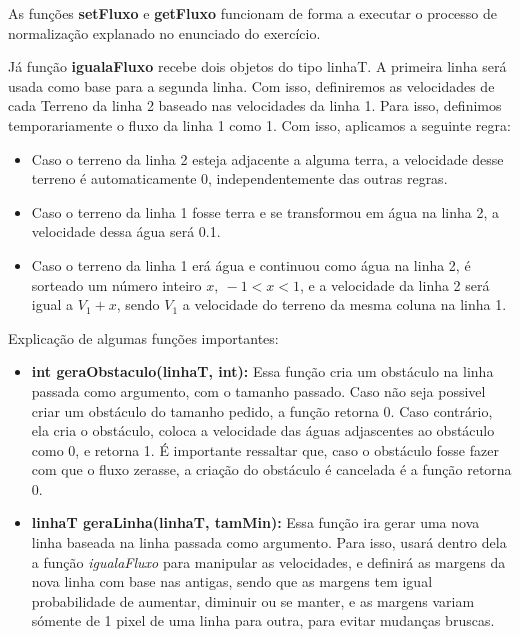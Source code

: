 \documentclass[11pt]{article}
\begin{document}
As funções \textbf{setFluxo} e \textbf{getFluxo} funcionam de forma a executar o processo de normalização explanado no enunciado do exercício.

Já função \textbf{igualaFluxo} recebe dois objetos do tipo linhaT. A primeira linha será usada como base para a segunda linha. Com isso, definiremos as velocidades de cada Terreno da linha 2 baseado nas velocidades da linha 1.
Para isso, definimos temporariamente o fluxo da linha 1 como 1. Com isso, aplicamos a seguinte regra:
\begin{itemize}
	
	\item Caso o terreno da linha 2 esteja adjacente a alguma terra, a velocidade desse terreno é automaticamente 0, independentemente das outras regras.

	\item Caso o terreno da linha 1 fosse terra e se transformou em água na linha 2, a velocidade dessa água será 0.1.

	\item Caso o terreno da linha 1 erá água e continuou como água na linha 2, é sorteado um número inteiro $x,\  -1 < x < 1$, e a velocidade da linha 2 será igual a $V_1 + x$, sendo $V_1$ a velocidade do terreno da mesma coluna na linha 1.
	
\end{itemize}

Explicação de algumas funções importantes:
\begin{itemize}

\item \textbf{int geraObstaculo({\color{red}linhaT}, {\color{red}int}):} Essa função cria um obstáculo na linha passada como argumento, com o tamanho passado. Caso não seja possivel criar um obstáculo do tamanho pedido, a função retorna 0. Caso contrário, ela cria o obstáculo, coloca a velocidade das águas adjascentes ao obstáculo como 0, e retorna 1. É importante ressaltar que, caso o obstáculo fosse fazer com que o fluxo zerasse, a criação do obstáculo é cancelada é a função retorna 0.

\item \textbf{linhaT geraLinha({\color{red}linhaT}, {\color{red}tamMin}):}
Essa função ira gerar uma nova linha baseada na linha passada como argumento. Para isso, usará dentro dela a função \emph{igualaFluxo} para manipular as velocidades, e definirá as margens da nova linha com base nas antigas, sendo que as margens tem igual probabilidade de aumentar, diminuir ou se manter, e as margens variam sómente de 1 pixel de uma linha para outra, para evitar mudanças bruscas.


\end{itemize}
\end{document}
